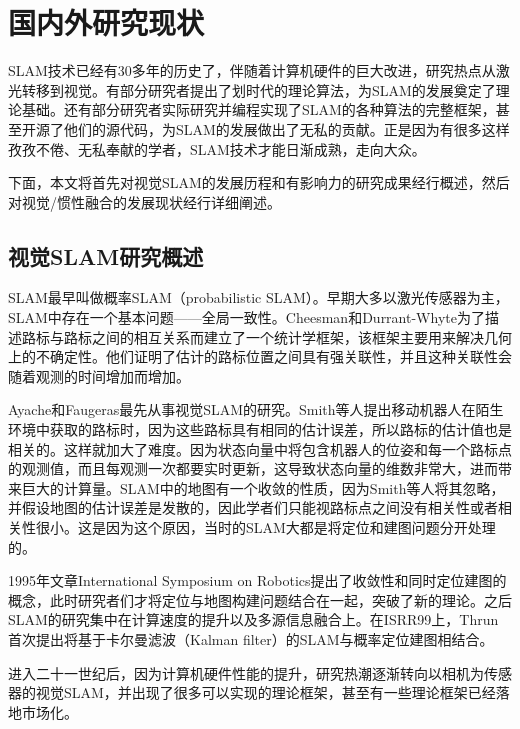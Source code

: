 \section{国内外研究现状}
SLAM技术已经有30多年的历史了，伴随着计算机硬件的巨大改进，研究热点从激光转移到视觉。有部分研究者提出了划时代的理论算法，为SLAM的发展奠定了理论基础。还有部分研究者实际研究并编程实现了SLAM的各种算法的完整框架，甚至开源了他们的源代码，为SLAM的发展做出了无私的贡献。正是因为有很多这样孜孜不倦、无私奉献的学者，SLAM技术才能日渐成熟，走向大众。

下面，本文将首先对视觉SLAM的发展历程和有影响力的研究成果经行概述，然后对视觉/惯性融合的发展现状经行详细阐述。

\subsection{视觉SLAM研究概述}

SLAM最早叫做概率SLAM（probabilistic SLAM）。早期大多以激光传感器为主，SLAM中存在一个基本问题——全局一致性。Cheesman和Durrant-Whyte为了描述路标与路标之间的相互关系而建立了一个统计学框架，该框架主要用来解决几何上的不确定性。他们证明了估计的路标位置之间具有强关联性，并且这种关联性会随着观测的时间增加而增加。

Ayache和Faugeras最先从事视觉SLAM的研究。Smith等人提出移动机器人在陌生环境中获取的路标时，因为这些路标具有相同的估计误差，所以路标的估计值也是相关的。这样就加大了难度。因为状态向量中将包含机器人的位姿和每一个路标点的观测值，而且每观测一次都要实时更新，这导致状态向量的维数非常大，进而带来巨大的计算量。SLAM中的地图有一个收敛的性质，因为Smith等人将其忽略，并假设地图的估计误差是发散的，因此学者们只能视路标点之间没有相关性或者相关性很小。这是因为这个原因，当时的SLAM大都是将定位和建图问题分开处理的。


1995年文章International Symposium on Robotics提出了收敛性和同时定位建图的概念，此时研究者们才将定位与地图构建问题结合在一起，突破了新的理论。之后SLAM的研究集中在计算速度的提升以及多源信息融合上。在ISRR99上，Thrun首次提出将基于卡尔曼滤波（Kalman filter）的SLAM与概率定位建图相结合。

进入二十一世纪后，因为计算机硬件性能的提升，研究热潮逐渐转向以相机为传感器的视觉SLAM，并出现了很多可以实现的理论框架，甚至有一些理论框架已经落地市场化。

